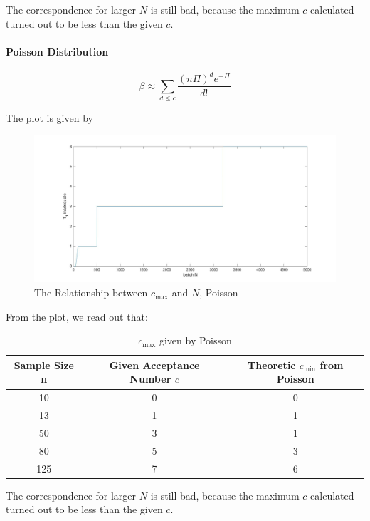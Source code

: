 \documentclass[a4paper]{article}
\begin{document}
The correspondence for larger $N$ is still bad, because the maximum $c$ calculated turned out to be less than the given $c$.

\paragraph{Poisson Distribution}
$$\beta \approx \sum_{d\leq c} \frac{(n\Pi)^de^{-\Pi}}{d!}$$

The plot is given by
\begin{figure}[!htbp] 
\centering 
\includegraphics[width=1\linewidth]{beta-pois.jpg}  
\caption{The Relationship between $c_{\max}$ and $N$, Poisson} 
\end{figure}

\newpage

From the plot, we read out that:
\begin{table}[!htbp]
  \centering
    \begin{tabular}{ccc}
    \hline
    Sample Size n & Given Acceptance Number $c$ & Theoretic $c_{\min}$ from Poisson \\
    \hline
    10    & 0     & 0 \\
    13    & 1     & 1 \\
    50    & \cellcolor[rgb]{ .851,  .882,  .949}3     & \cellcolor[rgb]{ .851,  .882,  .949}1 \\
    80    & \cellcolor[rgb]{ .851,  .882,  .949}5     & \cellcolor[rgb]{ .851,  .882,  .949}3 \\
    125   & \cellcolor[rgb]{ .851,  .882,  .949}7     & \cellcolor[rgb]{ .851,  .882,  .949}6 \\
    \hline
    \end{tabular}%
    \caption{$c_{\max}$ given by Poisson}
\end{table}%

The correspondence for larger $N$ is still bad, because the maximum $c$ calculated turned out to be less than the given $c$.
\end{document}
